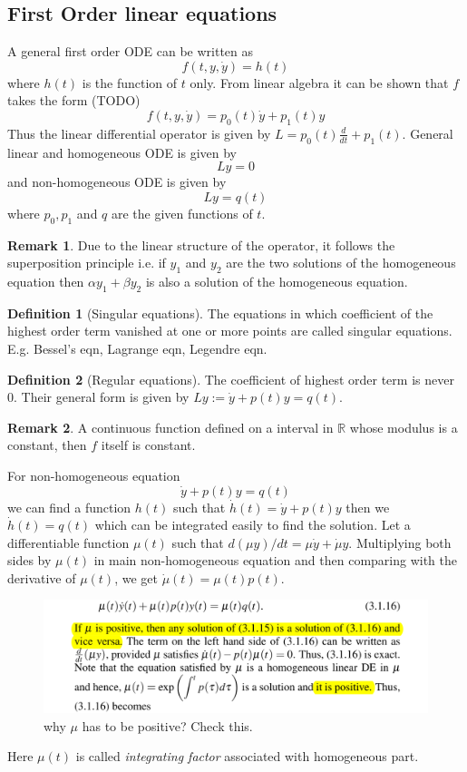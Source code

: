 \documentclass[12pt,reqno]{amsart}
\theoremstyle{plain}
\theoremstyle{definition}
\newtheorem{defn}{Definition}
\newtheorem{rem}{Remark}
\newcommand{\R}{\mathbb{R}}
\begin{document}
\subsection{First Order linear equations}
A general first order ODE can be written as
$$ f(t, y, \dot{y}) = h(t)$$
where $h(t)$ is the function of $t$ only. From linear algebra it can be shown that $f$ takes the form (TODO)
$$ f(t,y,\dot{y}) = p_0(t)\dot{y} + p_1(t)y$$
Thus the linear differential operator is given by $ L = p_0(t)\frac{d}{dt} + p_1(t)$. General linear and homogeneous ODE is given by $$ Ly = 0$$ and non-homogeneous ODE is given by $$ Ly = q(t)$$ where $p_0, p_1$ and $q$ are the given functions of $t$.
\begin{rem}
    Due to the linear structure of the operator, it follows the superposition principle i.e. if $y_1$ and $y_2$ are the two solutions of the homogeneous equation then $\alpha y_1 + \beta y_2$ is also a solution of the homogeneous equation.
\end{rem}
\begin{defn}[Singular equations]
    The equations in which coefficient of the highest order term vanished at one or more points are called singular equations. E.g. Bessel's eqn, Lagrange eqn, Legendre eqn.
\end{defn}
\begin{defn}[Regular equations]
    The coefficient of highest order term is never $0$. Their general form is given by $Ly := \dot{y} + p(t)y = q(t)$.
\end{defn}
\begin{rem}
    A continuous function defined on a interval in $\R$ whose modulus is a constant, then $f$ itself is constant.  
\end{rem}
\par For non-homogeneous equation
$$ \dot{y} + p(t)y = q(t) $$
we can find a function $h(t)$ such that $ \dot{h}(t) = \dot{y} + p(t)y$ then we $\dot{h}(t) = q(t)$ which can be integrated easily to find the solution. Let a differentiable function $\mu(t)$ such that $d(\mu y) /dt = \mu \dot{y} + \dot{\mu}y$. Multiplying both sides by $\mu(t)$ in main non-homogeneous equation and then comparing with the derivative of $\mu(t)$, we get $\dot{\mu}(t) = \mu(t)p(t)$. 
\begin{figure}[!ht]
    \centerline{\includegraphics[scale=.30]{../assests/integrating_fac.png}}
    \caption{why $\mu$ has to be positive? Check this.}
    \label{fig1}
\end{figure}
Here $\mu(t)$ is called {\it integrating factor} associated with homogeneous part.
\end{document}
